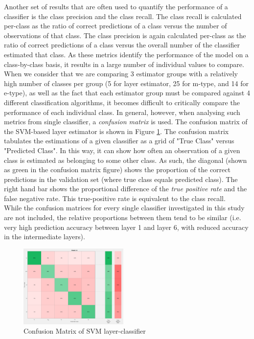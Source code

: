 \documentclass[letterpaper, 10 pt, conference]{ieeeconf}  %
\begin{document}
Another set of results that are often used to quantify the performance of a classifier is the class precision and the class recall. The class recall is calculated per-class as the ratio of correct predictions of a class versus the number of observations of that class. The class precision is again calculated per-class as the ratio of correct predictions of a class versus the overall number of the classifier estimated that class.  As these metrics identify the performance of the model on a class-by-class basis, it results in a large number of individual values to compare. When we consider that we are comparing 3 estimator groups with a relatively high number of classes per group (5 for layer estimator, 25 for m-type, and 14 for e-type), as well as the fact that each estimator group must be compared against 4 different classification algorithms, it becomes difficult to critically compare the performance of each individual class. In general, however, when analysing such metrics from single classifier, a \emph{confusion matrix} is used. The confusion matrix of the SVM-based layer estimator is shown in Figure \ref{fig:svmConfMatLayer}. The confusion matrix tabulates the estimations of a given classifier as a grid of "True Class" versus "Predicted Class". In this way, it can show how often an observation of a given class is estimated as belonging to some other class. As such, the diagonal (shown as green in the confusion matrix figure) shows the proportion of the correct predictions in the validation set (where true class equals predicted class). The right hand bar shows the proportional difference of the \emph{true positive rate} and the {false negative rate}. This true-positive rate is equivalent to the class recall.\\
While the confusion matrices for every single classifier investigated in this study are not included, the relative proportions between them tend to be similar (i.e. very high prediction accuracy between layer 1 and layer 6, with reduced accuracy in the intermediate layers).

\begin{figure}[ht]
    \centering
    \includegraphics[width=0.48\textwidth]{svmLayerConf.png}
    \caption{Confusion Matrix of SVM layer-classifier}
    \label{fig:svmConfMatLayer}
\end{figure}
\end{document}
